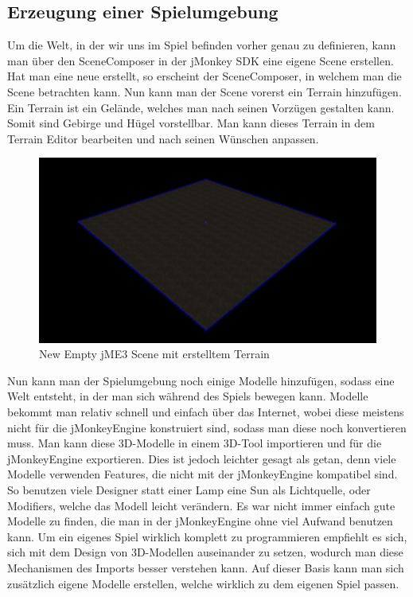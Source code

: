 \subsection{Erzeugung einer Spielumgebung}
Um die Welt, in der wir uns im Spiel befinden vorher genau zu definieren, kann man über den SceneComposer in der jMonkey SDK eine eigene Scene erstellen. Hat man eine neue  erstellt, so erscheint der SceneComposer, in welchem man die Scene betrachten kann. Nun kann man der Scene vorerst ein Terrain hinzufügen. Ein Terrain ist ein Gelände, welches man nach seinen Vorzügen gestalten kann. Somit sind Gebirge und Hügel vorstellbar. Man kann dieses Terrain in dem Terrain Editor bearbeiten und nach seinen Wünschen anpassen. 
\begin{figure}[h!]
	
	\caption{New Empty jME3 Scene mit erstelltem Terrain}
	
	\includegraphics[width=.8\linewidth]{images/EmptySceneWithTerrain} 
	
\end{figure}
Nun kann man der Spielumgebung noch einige Modelle hinzufügen, sodass eine Welt entsteht, in der man sich während des Spiels bewegen kann. Modelle bekommt man relativ schnell und einfach über das Internet, wobei diese meistens nicht für die jMonkeyEngine konstruiert sind, sodass man diese noch konvertieren muss. Man kann diese 3D-Modelle in einem 3D-Tool importieren und für die jMonkeyEngine exportieren. Dies ist jedoch leichter gesagt als getan, denn viele Modelle verwenden Features, die nicht mit der jMonkeyEngine kompatibel sind. So benutzen viele Designer statt einer Lamp eine Sun als Lichtquelle, oder Modifiers, welche das Modell leicht verändern. Es war nicht immer einfach gute Modelle zu finden, die man in der jMonkeyEngine ohne viel Aufwand benutzen kann. Um ein eigenes Spiel wirklich komplett zu programmieren empfiehlt es sich, sich mit dem Design von 3D-Modellen auseinander zu setzen, wodurch man diese Mechanismen des Imports besser verstehen kann. Auf dieser Basis kann man sich zusätzlich eigene Modelle erstellen, welche wirklich zu dem eigenen Spiel passen. 

